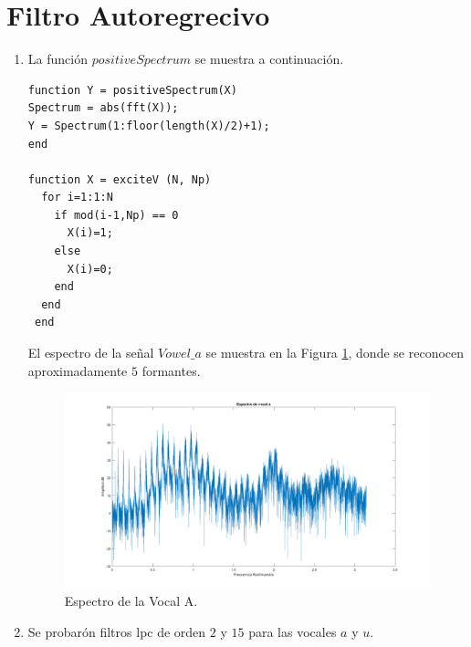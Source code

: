 \documentclass[letterpaper,onecolumn,10pt,journal,final]{IEEEtran}
\begin{document}
\section{Filtro Autoregrecivo}
\begin{enumerate}[1)]
\item %
%
La función $positiveSpectrum$ se muestra a continuación.
%
\begin{lstlisting}
function Y = positiveSpectrum(X)
Spectrum = abs(fft(X));
Y = Spectrum(1:floor(length(X)/2)+1);
end

function X = exciteV (N, Np)
  for i=1:1:N
    if mod(i-1,Np) == 0
      X(i)=1;
    else
      X(i)=0;
    end
  end
 end
\end{lstlisting}
%
El espectro de la señal $Vowel\_a$ se muestra en la Figura \ref{P4_1}, donde se reconocen aproximadamente $5$ formantes.
%
\begin{figure}[H]
    \centering
    \includegraphics[width = 0.9 \linewidth]{Figuras/P4_1.png}
    \caption{Espectro de la Vocal A.}
    \label{P4_1}
\end{figure}
%
\item %
Se probarón filtros lpc de orden $2$ y $15$ para las vocales $a$ y $u$.


\end{enumerate}
\end{document}

